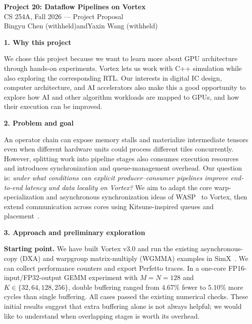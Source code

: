 \documentclass[11pt,letterpaper]{article}
\newcommand{\MemberOne}{Bingyu Chen}
\newcommand{\MemberTwo}{Yaxin Wang}
\newcommand{\proposalheading}[1]{%
  \par\addvspace{0.55em}\noindent\textbf{#1}\par\nobreak\vspace{0.08em}}
\begin{document}
\begin{center}
{\large\bfseries Project 20: Dataflow Pipelines on Vortex}\\[0.25em]
CS 254A, Fall 2026 --- Project Proposal\\[0.25em]
\MemberOne{} (withheld)\quad and\quad \MemberTwo{} (withheld)
\end{center}
\vspace{-0.45em}

\proposalheading{1. Why this project}
We chose this project because we want to learn more about GPU architecture through
hands-on experiments. Vortex lets us work with C++ simulation while also exploring
the corresponding RTL. Our interests in digital IC design, computer architecture,
and AI accelerators also make this a good opportunity to explore how AI and other
algorithm workloads are mapped to GPUs, and how their execution can be improved.

\proposalheading{2. Problem and goal}
An operator chain can expose memory stalls and materialize intermediate tensors even
when different hardware units could process different tiles concurrently. However,
splitting work into pipeline stages also consumes execution resources and introduces
synchronization and queue-management overhead. Our question is:
\emph{under what conditions can explicit producer--consumer pipelines improve
end-to-end latency and data locality on Vortex?}
We aim to adapt the core warp-specialization and asynchronous synchronization ideas
of WASP~\cite{wasp} to Vortex, then extend communication across cores using
Kitsune-inspired queues and placement~\cite{kitsune}.

\proposalheading{3. Approach and preliminary exploration}
\textbf{Starting point.}
We have built Vortex v3.0 and run the existing asynchronous-copy (DXA) and
warpgroup matrix-multiply (WGMMA) examples in SimX~\cite{vortex}.
We can collect performance counters and export Perfetto traces.
In a one-core FP16-input/FP32-output GEMM experiment with $M=N=128$ and
$K\in\{32,64,128,256\}$, double buffering ranged from 4.67\% fewer to 5.10\% more
cycles than single buffering. All cases passed the existing numerical checks.
These initial results suggest that extra buffering alone is not always helpful;
we would like to understand when overlapping stages is worth its overhead.
\end{document}
